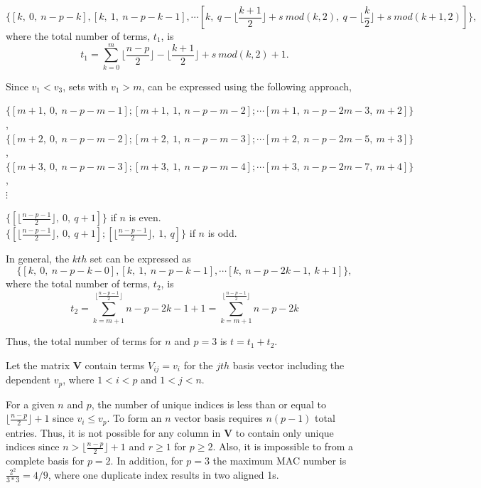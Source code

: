 \documentclass[3p,times]{elsarticle}
\begin{document}
\begin{equation}
\{[k,\ 0,\ n-p-k], [k,\ 1,\ n-p-k-1], \cdots [k,\ q-\lfloor \frac{k+1}{2}\rfloor+s\ mod(k,2),\ q-\lfloor \frac{k}{2}\rfloor+s\ mod(k+1,2)]\},
\end{equation}
where the total number of terms, $t_1$, is
\begin{equation}
t_1=\sum_{k=0}^{m} \lfloor\frac{n-p}{2}\rfloor-\lfloor\frac{k+1}{2}\rfloor+s\ mod(k,2)+1.
\end{equation}

Since $v_1<v_3$, sets with $v_1>m$, can be expressed using the following approach,
\begin{center}
$\{[m+1,\ 0,\ n-p-m-1]; [m+1,\ 1,\ n-p-m-2]; \cdots [m+1,\ n-p-2m-3,\ m+2]\}$,\\
$\{[m+2,\ 0,\ n-p-m-2]; [m+2,\ 1,\ n-p-m-3]; \cdots [m+2,\ n-p-2m-5,\ m+3]\}$,\\
$\{[m+3,\ 0,\ n-p-m-3]; [m+3,\ 1,\ n-p-m-4]; \cdots [m+3,\ n-p-2m-7,\ m+4]\}$,\\
$\vdots$ \\
\end{center}
\begin{center}
$\{[\lfloor\frac{n-p-1}{2}\rfloor,\ 0,\ q+1]\}$ if $n$ is even.\\
$\{[\lfloor\frac{n-p-1}{2}\rfloor,\ 0,\ q+1]; [\lfloor\frac{n-p-1}{2}\rfloor,\ 1,\ q]\}$ if $n$ is odd.
\end{center} 

In general, the $kth$ set can be expressed as 
\begin{equation}
\{[k,\ 0,\ n-p-k-0], [k,\ 1,\ n-p-k-1], \cdots [k,\ n-p-2k-1,\ k+1]\},
\end{equation}
where the total number of terms, $t_2$, is
\begin{equation}
t_2=\sum_{k=m+1}^{\lfloor\frac{n-p-1}{2}\rfloor} n-p-2k-1+1 =\sum_{k=m+1}^{\lfloor\frac{n-p-1}{2}\rfloor} n-p-2k
\end{equation}

Thus, the total number of terms for $n$ and $p=3$ is $t=t_1+t_2$.  

Let the matrix $\textbf{V}$ contain terms $V_{ij}=v_i$ for the $jth$ basis vector including the dependent $v_p$, where $1<i<p$ and $1<j<n$.

For a given $n$ and $p$, the number of unique indices is less than or equal to $\lfloor \frac{n-p}{2}\rfloor+1$ since $v_i\le v_p$.  To form an $n$ vector basis requires
$n\left(p-1\right)$ total entries.  Thus, it is not possible for any column in $\textbf{V}$ to contain only unique indices since $n>\lfloor \frac{n-p}{2}\rfloor+1$ and $r\ge 1$ for $p\ge2$.  Also, it is impossible to from a complete basis for $p=2$.  In addition, for $p=3$ the maximum MAC number is $\frac{2^2}{3*3}=4/9$, where one duplicate index results in two aligned 1s.
\end{document}
